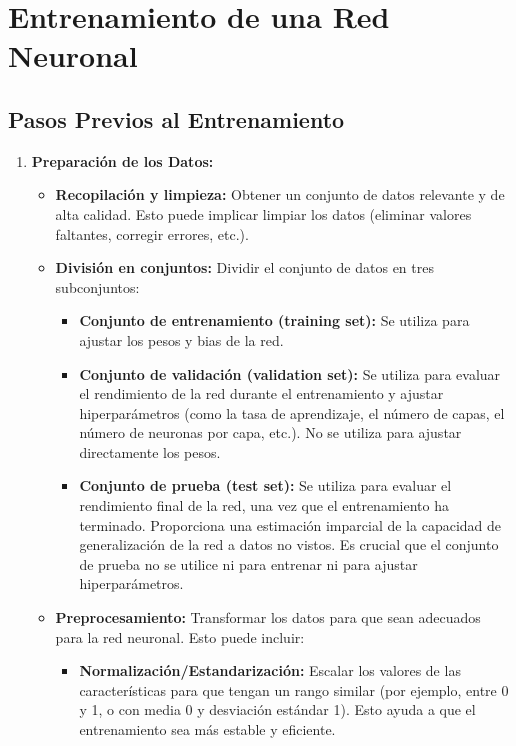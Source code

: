 \documentclass{article}
\begin{document}
\section{Entrenamiento de una Red Neuronal}

\subsection{Pasos Previos al Entrenamiento}

\begin{enumerate}
    \item \textbf{Preparación de los Datos:}
        \begin{itemize}
            \item \textbf{Recopilación y limpieza:} Obtener un conjunto de datos relevante y de alta calidad. Esto puede implicar limpiar los datos (eliminar valores faltantes, corregir errores, etc.).
            \item \textbf{División en conjuntos:} Dividir el conjunto de datos en tres subconjuntos:
                \begin{itemize}
                    \item \textbf{Conjunto de entrenamiento (training set):} Se utiliza para ajustar los pesos y bias de la red.
                    \item \textbf{Conjunto de validación (validation set):} Se utiliza para evaluar el rendimiento de la red durante el entrenamiento y ajustar hiperparámetros (como la tasa de aprendizaje, el número de capas, el número de neuronas por capa, etc.).  No se utiliza para ajustar directamente los pesos.
                    \item \textbf{Conjunto de prueba (test set):} Se utiliza para evaluar el rendimiento final de la red, una vez que el entrenamiento ha terminado.  Proporciona una estimación imparcial de la capacidad de generalización de la red a datos no vistos. Es crucial que el conjunto de prueba no se utilice ni para entrenar ni para ajustar hiperparámetros.
                \end{itemize}
            \item \textbf{Preprocesamiento:}  Transformar los datos para que sean adecuados para la red neuronal.  Esto puede incluir:
                \begin{itemize}
                    \item \textbf{Normalización/Estandarización:} Escalar los valores de las características para que tengan un rango similar (por ejemplo, entre 0 y 1, o con media 0 y desviación estándar 1).  Esto ayuda a que el entrenamiento sea más estable y eficiente.

\end{itemize}
\end{itemize}
\end{enumerate}
\end{document}
